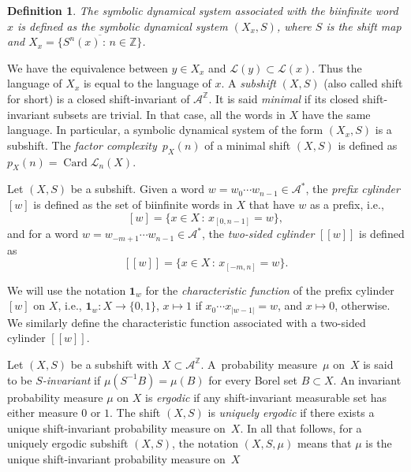 \documentclass{article}
\newtheorem{definition}[lemma]{Definition}
\theoremstyle{definition}
\DeclareMathOperator{\Card}{Card}
\begin{document}
\begin{definition}\label{def-rec-lin}
The  symbolic dynamical system  associated with the  biinfinite word $x$ is  defined as the symbolic dynamical system $(X_x, S)$, where $S$ is the shift map and $X_x=\overline{\{S^n(x) \,: \,  n\in\mathbb{Z}\}}$.

\end{definition}

We have the  equivalence between $y \in X_x$ and $\mathcal L(y) \subset \mathcal L(x)$. Thus the language of $X_x$ is equal to the language of $x$. 
A  {\em subshift}  $(X,S)$   (also called shift for short) is   a closed shift-invariant of  $\mathcal{A}^\mathbb{Z}$. 
It is said  {\em minimal} if  its closed shift-invariant  subsets are trivial. In that case, all the words in $X$ have the same language.
In particular, a  symbolic dynamical system of the form  $(X_x, S)$ is a subshift.  The \emph{factor complexity}~$p_X(n)$ of a minimal shift $(X,S)$ is defined  as 
$p_X(n) = {\Card} \mathcal{L}_n(X)$.  



 Let $(X,S)$ be a subshift.
Given a  word $w=w_0 \cdots w_{n-1}  \in  \mathcal{A}^*$, the  {\em prefix cylinder} $[w]$ is defined as  the set of biinfinite words  in $X$  that  have $w$ as a prefix, i.e.,
$$[w]=\{ x \in  X \,: \,  x_{[0,n-1]}= w\},$$
and for a  word $w=w_{-m+1}  \cdots w_{n-1}  \in  \mathcal{A}^*$, the {\em two-sided  cylinder} $[[w]]$ is  defined as 
$$[[w]]=\{ x \in  X \,: \,  x_{[-m,n]}= w\}.$$

 We will use the notation ${\mathbf 1}_w$       for the {\em characteristic function}  of the  prefix cylinder $[w]$  on $X$, i.e., 
 ${\mathbf 1}_w \colon X \rightarrow \{0,1\}$,  $x \mapsto 1$ if $x_{0}\cdots x_{|w-1|}= w$,  and  $x \mapsto 0$, otherwise.
 We similarly define the characteristic function  associated  with  a two-sided cylinder $[[w]]$.
 



 Let $(X,S)$ be a subshift with $X \subset \mathcal{A}^{\mathbb{Z}}$. 
A~probability measure~$\mu$ on~$X$ is said to be \emph{$S$-invariant} if $\mu(S^{-1} B) = \mu(B)$ for every Borel set $B \subset X$.
  An invariant probability measure  $\mu$ on $X$ is  \emph{ergodic} if any shift-invariant measurable set
has either measure $0$ or $1$.
The shift $(X,S)$ is \emph{uniquely ergodic} if there exists a unique shift-invariant probability measure on~$X$. 
In all that follows,  for a  uniquely ergodic  subshift $(X,S)$,   the notation $(X,S,\mu)$   means that $\mu$ is the  unique shift-invariant probability measure on~$X$
\end{document}
